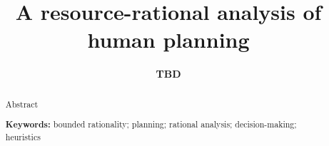 \documentclass[10pt,letterpaper]{article}
\title{A resource-rational analysis of human planning}
\author{
  {\large \bf TBD}
  \AND {\large \bf TBD} 
  }
\newcommand{\fl}[1]{\textcolor{red}{\textsc{[#1 -Falk]}}}
\begin{document}
\maketitle

\begin{abstract}
Abstract

\textbf{Keywords:} bounded rationality; planning; rational analysis; decision-making; heuristics

\end{abstract}











\setlength{\bibleftmargin}{.125in}
\setlength{\bibindent}{-\bibleftmargin}


\end{document}
